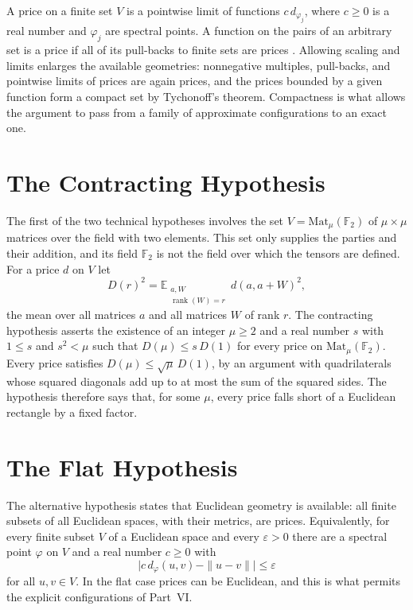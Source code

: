 \documentclass[11pt,letterpaper]{report}
\theoremstyle{plain}
\theoremstyle{definition}
\theoremstyle{remark}
\begin{document}
A price on a finite set $V$ is a pointwise limit of functions $c\,d_{\varphi_j}$, where $c\ge0$ is a real number and $\varphi_j$ are spectral points. A function on the pairs of an arbitrary set is a price if all of its pull-backs to finite sets are prices \cite{Source2026}. Allowing scaling and limits enlarges the available geometries: nonnegative multiples, pull-backs, and pointwise limits of prices are again prices, and the prices bounded by a given function form a compact set by Tychonoff's theorem. Compactness is what allows the argument to pass from a family of approximate configurations to an exact one.

\section{The Contracting Hypothesis}

The first of the two technical hypotheses involves the set $V=\mathrm{Mat}_\mu(\mathbb F_2)$ of $\mu\times\mu$ matrices over the field with two elements. This set only supplies the parties and their addition, and its field $\mathbb F_2$ is not the field over which the tensors are defined. For a price $d$ on $V$ let
\[
D(r)^2=\mathbb E_{\substack{a,W\\\operatorname{rank}(W)=r}}\,d(a,a+W)^2,
\]
the mean over all matrices $a$ and all matrices $W$ of rank $r$. The contracting hypothesis asserts the existence of an integer $\mu\ge2$ and a real number $s$ with $1\le s$ and $s^2<\mu$ such that $D(\mu)\le s\,D(1)$ for every price on $\mathrm{Mat}_\mu(\mathbb F_2)$. Every price satisfies $D(\mu)\le\sqrt\mu\,D(1)$, by an argument with quadrilaterals whose squared diagonals add up to at most the sum of the squared sides. The hypothesis therefore says that, for some $\mu$, every price falls short of a Euclidean rectangle by a fixed factor.

\section{The Flat Hypothesis}

The alternative hypothesis states that Euclidean geometry is available: all finite subsets of all Euclidean spaces, with their metrics, are prices. Equivalently, for every finite subset $V$ of a Euclidean space and every $\varepsilon>0$ there are a spectral point $\varphi$ on $V$ and a real number $c\ge0$ with
\[
\bigl|c\,d_\varphi(u,v)-\|u-v\|\bigr|\le\varepsilon
\]
for all $u,v\in V$. In the flat case prices can be Euclidean, and this is what permits the explicit configurations of Part~VI.
\end{document}
